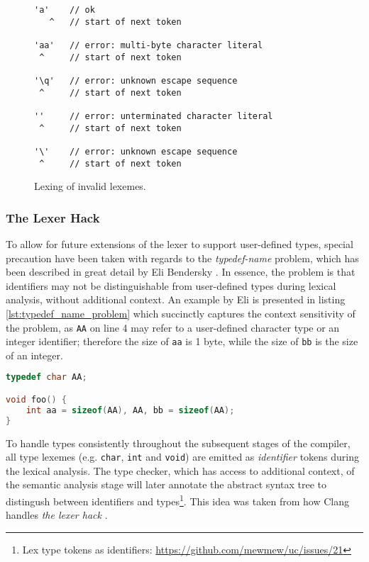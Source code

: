 \begin{figure}[htbp]
	\centering
\begin{BVerbatim}
'a'    // ok
   ^   // start of next token

'aa'   // error: multi-byte character literal
 ^     // start of next token

'\q'   // error: unknown escape sequence
 ^     // start of next token

''     // error: unterminated character literal
 ^     // start of next token

'\'    // error: unknown escape sequence
 ^     // start of next token
\end{BVerbatim}
	\caption{Lexing of invalid lexemes.}
	\label{fig:invalid_lexemes}
\end{figure}

\subsubsection{The Lexer Hack}

To allow for future extensions of the lexer to support user-defined types, special precaution have been taken with regards to the \textit{typedef-name} problem, which has been described in great detail by Eli Bendersky \cite{typedef_name_problem}. In essence, the problem is that identifiers may not be distinguishable from user-defined types during lexical analysis, without additional context. An example by Eli is presented in listing \ref{lst:typedef_name_problem} which succinctly captures the context sensitivity of the problem, as \texttt{AA} on line 4 may refer to a user-defined character type or an integer identifier; therefore the size of \texttt{aa} is 1 byte, while the size of \texttt{bb} is the size of an integer.

\begin{lstlisting}[language=C,style=c,caption={An example of the \textit{typedef-name} problem.},label={lst:typedef_name_problem}]
typedef char AA;

void foo() {
	int aa = sizeof(AA), AA, bb = sizeof(AA);
}
\end{lstlisting}

To handle types consistently throughout the subsequent stages of the compiler, all type lexemes (e.g. \texttt{char}, \texttt{int} and \texttt{void}) are emitted as \textit{identifier} tokens during the lexical analysis. The type checker, which has access to additional context, of the semantic analysis stage will later annotate the abstract syntax tree to distingush between identifiers and types\footnote{Lex type tokens as identifiers: \url{https://github.com/mewmew/uc/issues/21}}. This idea was taken from how Clang handles \textit{the lexer hack} \cite{the_lexer_hack,clang_no_lexer_hack}.
